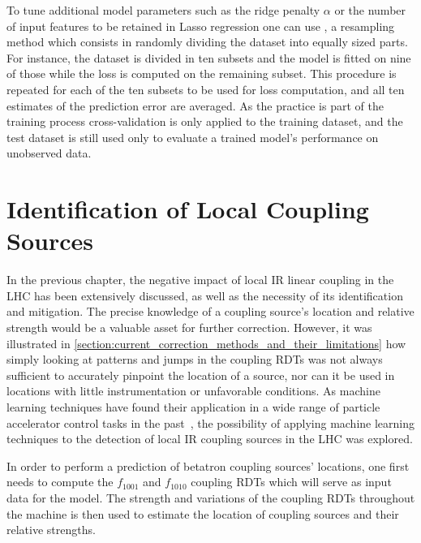 To tune additional model parameters such as the ridge penalty \(\alpha\) or the number of input features to be retained in Lasso regression one can use , a resampling method which consists in randomly dividing the dataset into equally sized parts.
For instance, the dataset is divided in ten subsets and the model is fitted on nine of those while the loss is computed on the remaining subset.
This procedure is repeated for each of the ten subsets to be used for loss computation, and all ten estimates of the prediction error are averaged.
As the practice is part of the training process cross-validation is only applied to the training dataset, and the test dataset is still used only to evaluate a trained model's performance on unobserved data.

\section{Identification of Local Coupling Sources}

In the previous chapter, the negative impact of local \gls{IR} linear coupling in the \gls{LHC} has been extensively discussed, as well as the necessity of its identification and mitigation.
The precise knowledge of a coupling source's location and relative strength would be a valuable asset for further correction.
However, it was illustrated in \cref{section:current_correction_methods_and_their_limitations} how simply looking at patterns and jumps in the coupling \glspl{RDT} was not always sufficient to accurately pinpoint the  location of a source, nor can it be used in locations with little instrumentation or unfavorable conditions.
As machine learning techniques have found their application in a wide range of particle accelerator control tasks in the past~\cite{IPAC:Fol:Machine_Learning_Methods_for_Optics_Measurements_and_Corrections_at_LHC, IEEE:Edelen:Neural_Networks_Modeling_Control_Particle_Accelerators, EPAC:Bozoki:Neural_Networks_Orbit_Control_Accelerators, IPAC:Meier:Orbit_Correction_Studies_using_Neural_Networks, EPAC:Kijima:Beam_Diagnostic_System_for_Accelerator_using_Neural_Networks, PRAB:Fol:Detection_Faulty_BPMs, EPJP:Fol:Supervised_Learning_Reconstruction_Magnet_Errors}, the possibility of applying machine learning techniques to the detection of local IR coupling sources in the LHC was explored.

In order to perform a prediction of betatron coupling sources' locations, one first needs to compute the \(f_{1001}\) and \(f_{1010}\) coupling RDTs which will serve as input data for the model.
The strength and variations of the coupling RDTs throughout the machine is then used to estimate the location of coupling sources and their relative strengths.

